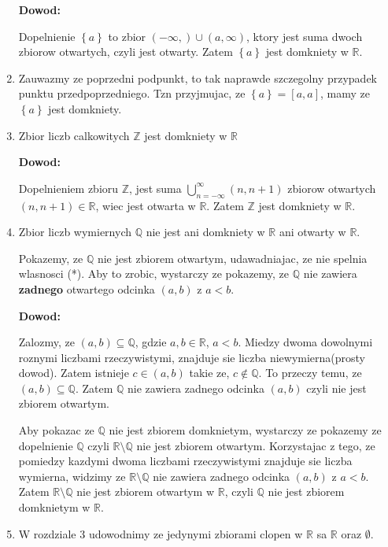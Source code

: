 \documentclass{article}
\begin{document}
\begin{enumerate}[label=(\alph*)]
        \textbf{Dowod:}

        Dopelnienie $\left\{ a \right\}$ to zbior $(-\infty, ) \cup (a, \infty)$, ktory jest suma dwoch zbiorow otwartych, czyli jest otwarty. Zatem $\left\{ a \right\}$ jest domkniety w $\mathbb{R}$.

    \item Zauwazmy ze poprzedni podpunkt, to tak naprawde szczegolny przypadek punktu przedpoprzedniego. Tzn przyjmujac, ze ${\left\{ a \right\}} = [a,a]$, mamy ze $\left\{ a \right\}$ jest domkniety.

    \item Zbior liczb calkowitych $\mathbb{Z}$ jest domkniety w $\mathbb{R}$

        \textbf{Dowod:}

        Dopelnieniem zbioru $\mathbb{Z}$, jest suma $\bigcup\limits_{n=-\infty}^{\infty}(n, n+1)$ zbiorow otwartych $(n, n+1) \in \mathbb{R}$, wiec jest otwarta w $\mathbb{R}$. Zatem $\mathbb{Z}$ jest domkniety w $\mathbb{R}$.

    \item Zbior liczb wymiernych $\mathbb{Q}$ nie jest ani domkniety w $\mathbb{R}$ ani otwarty w $\mathbb{R}$.

        Pokazemy, ze $\mathbb{Q}$ nie jest zbiorem otwartym, udawadniajac, ze nie spelnia wlasnosci (*). Aby to zrobic, wystarczy ze pokazemy, ze $\mathbb{Q}$ nie zawiera \textbf{zadnego} otwartego odcinka $(a,b)$ z $a<b$.

        \textbf{Dowod:}

        Zalozmy, ze $(a,b) \subseteq \mathbb{Q}$, gdzie $a,b \in \mathbb{R}$, $a<b$. Miedzy dwoma dowolnymi roznymi liczbami rzeczywistymi, znajduje sie liczba niewymierna(prosty dowod). Zatem istnieje $c \in (a,b)$ takie ze, $c \notin \mathbb{Q}$. To przeczy temu, ze $(a,b) \subseteq \mathbb{Q}$. Zatem $\mathbb{Q}$ nie zawiera zadnego odcinka $(a,b)$ czyli nie jest zbiorem otwartym.

        Aby pokazac ze $\mathbb{Q}$ nie jest zbiorem domknietym, wystarczy ze pokazemy ze dopelnienie $\mathbb{Q}$ czyli $\mathbb{R} \setminus \mathbb{Q}$ nie jest zbiorem otwartym. Korzystajac z tego, ze pomiedzy kazdymi dwoma liczbami rzeczywistymi znajduje sie liczba wymierna, widzimy ze $\mathbb{R} \setminus \mathbb{Q}$ nie zawiera zadnego odcinka $(a,b)$ z $a<b$. Zatem $\mathbb{R} \setminus \mathbb{Q}$ nie jest zbiorem otwartym w $\mathbb{R}$, czyli $\mathbb{Q}$ nie jest zbiorem domknietym w $\mathbb{R}$.

    \item W rozdziale 3 udowodnimy ze jedynymi zbiorami clopen w $\mathbb{R}$ sa $\mathbb{R}$ oraz $\mathbb{\emptyset}$.

\end{enumerate} %
\end{document}
